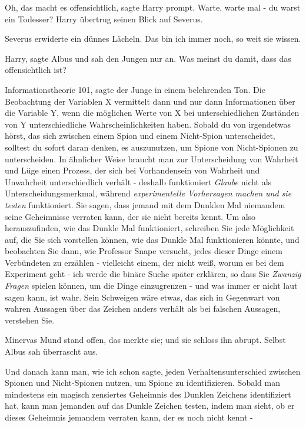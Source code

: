\glqq{}Oh, das macht es offensichtlich\grqq{}, sagte Harry prompt. \glqq{}Warte,
warte mal - du warst ein Todesser?\grqq{} Harry übertrug seinen Blick auf
Severus.

Severus erwiderte ein dünnes Lächeln. \glqq{}Das bin ich immer noch, so weit sie
wissen.\grqq{}

\glqq{}Harry\grqq{}, sagte Albus und sah den Jungen nur an. \glqq{}Was meinst du
damit, dass das offensichtlich ist?\grqq{}

\glqq{}Informationstheorie 101\grqq{}, sagte der Junge in einem belehrenden Ton.
\glqq{}Die Beobachtung der Variablen X vermittelt dann und nur dann Informationen
über die Variable Y, wenn die möglichen Werte von X bei unterschiedlichen
Zuständen von Y unterschiedliche Wahrscheinlichkeiten haben. Sobald du von
irgendetwas hörst, das sich zwischen einem Spion und einem Nicht-Spion
unterscheidet, solltest du sofort daran denken, es auszunutzen, um Spione von
Nicht-Spionen zu unterscheiden. In ähnlicher Weise braucht man zur
Unterscheidung von Wahrheit und Lüge einen Prozess, der sich bei Vorhandensein
von Wahrheit und Unwahrheit unterschiedlich verhält - deshalb funktioniert \glqq{}
\emph{Glaube}\grqq{} nicht als Unterscheidungsmerkmal, während \glqq{}
\emph{experimentelle Vorhersagen machen und sie testen}\grqq{} funktioniert. Sie
sagen, dass jemand mit dem Dunklen Mal niemandem seine Geheimnisse verraten
kann, der sie nicht bereits kennt. Um also herauszufinden, wie das Dunkle Mal
funktioniert, schreiben Sie jede Möglichkeit auf, die Sie sich vorstellen
können, wie das Dunkle Mal funktionieren könnte, und beobachten Sie dann, wie
Professor Snape versucht, jedes dieser Dinge einem Verbündeten zu erzählen -
vielleicht einem, der nicht weiß, worum es bei dem Experiment geht - ich werde
die binäre Suche später erklären, so dass Sie \emph{Zwanzig Fragen} spielen
können, um die Dinge einzugrenzen - und was immer er nicht laut sagen kann, ist
wahr. Sein Schweigen wäre etwas, das sich in Gegenwart von wahren Aussagen über
das Zeichen anders verhält als bei falschen Aussagen, verstehen Sie.\grqq{}

Minervas Mund stand offen, das merkte sie; und sie schloss ihn abrupt. Selbst
Albus sah überrascht aus.

\glqq{}Und danach kann man, wie ich schon sagte, jeden Verhaltensunterschied
zwischen Spionen und Nicht-Spionen nutzen, um Spione zu identifizieren. Sobald
man mindestens ein magisch zensiertes Geheimnis des Dunklen Zeichens
identifiziert hat, kann man jemanden auf das Dunkle Zeichen testen, indem man
sieht, ob er dieses Geheimnis jemandem verraten kann, der es noch nicht kennt
-\grqq{}

